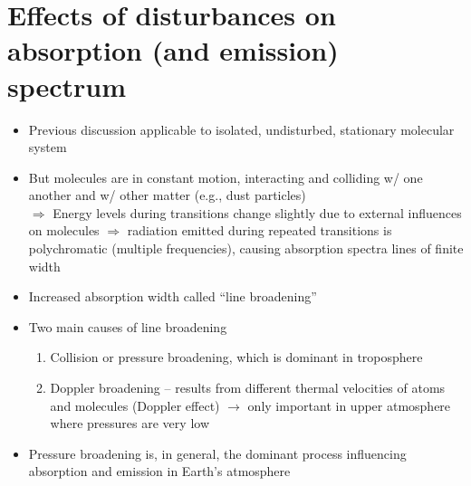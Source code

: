 \documentclass[11pt, oneside]{article}
\begin{document}
\section{Effects of disturbances on absorption (and emission) spectrum}
\label{s:broad}

\begin{itemize}
	\item[--] Previous discussion applicable to isolated, undisturbed, stationary molecular system
	\item[--] But molecules are in constant motion, interacting and colliding w/ one another and w/ other matter (e.g., dust particles)\\
	$\Rightarrow$ Energy levels during transitions change slightly due to external influences on molecules $\Rightarrow$ radiation emitted during repeated transitions is polychromatic (multiple frequencies), causing absorption spectra lines of finite width
	\item[--] Increased absorption width called ``line broadening''
	\item[--] Two main causes of line broadening
	\begin{enumerate}
		\item Collision or pressure broadening, which is dominant in troposphere
		\item Doppler broadening -- results from different thermal velocities of atoms and molecules (Doppler effect) $\rightarrow$ only important in upper atmosphere where pressures are very low
	\end{enumerate}
	\item[--] Pressure broadening is, in general, the dominant process influencing absorption and emission in Earth's atmosphere
\end{itemize}

\end{document}
